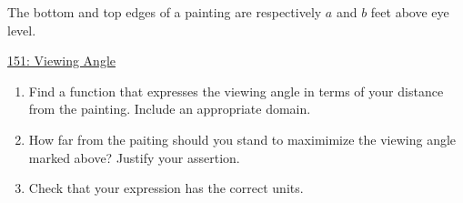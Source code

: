 \documentclass{ximera}
\begin{document}
\begin{question}  \label{Q677jhgjhjfdbn}
The bottom and top edges of a painting are respectively $a$ and $b$ feet above eye level.

\begin{onlineOnly}
   \begin{center}
\end{center}
\end{onlineOnly}

\href{https://www.desmos.com/calculator/dkqndsegod}{151: Viewing Angle}


\begin{enumerate}
\item Find a function that expresses the viewing angle in terms of your distance from the painting. Include an appropriate domain.

\item How far from the paiting should you stand to maximimize the viewing angle marked above? Justify your assertion.

\item Check that your expression has the correct units.

\end{enumerate}
\end{question}
\end{document}
